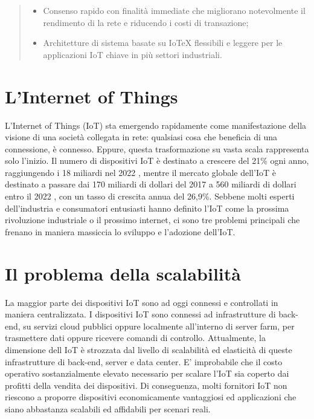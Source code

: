 \documentclass[a4paper,12pt,draft]{article}
\begin{document}
\begin{abstract}
\begin{itemize}
		\item
		      Consenso rapido con finalità immediate che migliorano notevolmente il rendimento di la rete e riducendo i costi di transazione;

		\item
		      Architetture di sistema basate su IoTeX flessibili e leggere per le applicazioni IoT chiave in più settori industriali.

	\end{itemize}

\end{abstract}

\pagebreak

\tableofcontents

\pagebreak

\section{L'Internet of Things}
L'Internet of Things (IoT) sta emergendo rapidamente come manifestazione della visione di una società collegata in rete: qualsiasi cosa che beneficia di una connessione, è connesso. Eppure, questa trasformazione su vasta scala rappresenta solo l'inizio. Il numero di dispositivi IoT è destinato a crescere del 21\% ogni anno, raggiungendo i 18 miliardi nel 2022 \cite{10}, mentre il mercato globale dell'IoT è destinato a passare dai 170 miliardi di dollari del 2017 a 560 miliardi di dollari entro il 2022 \cite{15}, con un tasso di crescita annua del 26,9\%. Sebbene molti esperti dell'industria e consumatori entusiasti hanno definito l'IoT come la prossima rivoluzione industriale o il prossimo internet, ci sono tre problemi principali che frenano in maniera massiccia lo sviluppo e l'adozione dell'IoT.

\section{Il problema della scalabilità}
La maggior parte dei dispositivi IoT sono ad oggi connessi e controllati in maniera centralizzata. I dispositivi IoT sono connessi ad infrastrutture di back-end, su servizi cloud pubblici oppure localmente all'interno di server farm, per trasmettere dati oppure ricevere comandi di controllo.
Attualmente, la dimensione dell IoT è strozzata dal livello di scalabilità ed elasticità di queste infrastrutture di back-end, server e data center. E' improbabile che il costo operativo sostanzialmente elevato necessario per scalare l'IoT sia coperto dai profitti della vendita dei dispositivi. Di conseguenza, molti fornitori IoT non riescono a proporre dispositivi economicamente vantaggiosi ed applicazioni che siano abbastanza scalabili ed affidabili per scenari reali.
\end{document}
